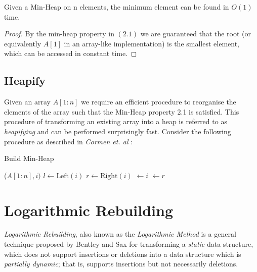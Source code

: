 \begin{lemma}
    Given a Min-Heap on n elements, the minimum element can be found in $O(1)$ time.
\end{lemma}
\begin{proof}
    By the min-heap property in $(2.1)$ we are guaranteed that the root (or equivalently $A[1]$ in an array-like implementation) is the smallest element, which can be accessed in constant time.
\end{proof}

\subsection{Heapify}
\label{ssec:heapify}

Given an array $A[1:n]$ we require an efficient procedure to reorganise the elements of the array such that the Min-Heap property 2.1 is satisfied. This procedure of transforming an existing array into a heap is referred to as \textit{heapifying} and can be performed surprisingly fast. Consider the following procedure as described in \textit{Cormen et. al} \cite{cormen01introduction}:

\begin{algorithm}
\caption{Build Min-Heap}\label{alg:heapify}
\begin{algorithmic}[1]
\State {}($A[1:n], i)$
\EndFor
\EndProcedure
\State
\State
{}
\State $l\gets \text{Left}(i)$
\State $r\gets \text{Right}(i)$
\State {} $\gets i$
\EndIf
{}
\State {} $\gets r$
\EndIf
{}
\State{}
\State{}
\EndIf
\EndProcedure



\end{algorithmic}
\end{algorithm}



\section{Logarithmic Rebuilding}
\label{sec:logarithmic-rebuilding}

\textit{Logarithmic Rebuilding}, also known as the \textit{Logarithmic Method} is a general technique proposed by Bentley and Sax \cite{BENTLEY1980301} for transforming a \textit{static} data structure, which does not support insertions or deletions into a data structure which is \textit{partially dynamic}; that is, supports insertions but not necessarily deletions.

